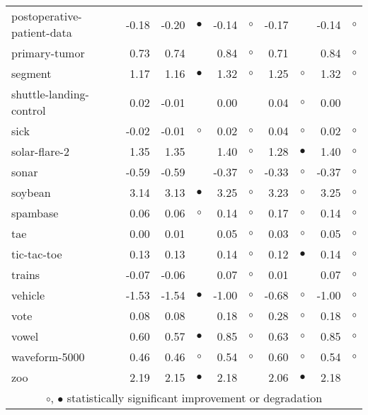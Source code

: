 {\begin{longtable}{lrr@{\hspace{0.1cm}}cr@{\hspace{0.1cm}}cr@{\hspace{0.1cm}}cr@{\hspace{0.1cm}}c}
postoperative-patient-data & -0.18 & -0.20 &  $\bullet$ & -0.14 &   $\circ$ & -0.17 &           & -0.14 &   $\circ$\\
primary-tumor &  0.73 &  0.74 &            &  0.84 &   $\circ$ &  0.71 &           &  0.84 &   $\circ$\\
segment &  1.17 &  1.16 &  $\bullet$ &  1.32 &   $\circ$ &  1.25 &   $\circ$ &  1.32 &   $\circ$\\
shuttle-landing-control &  0.02 & -0.01 &            &  0.00 &           &  0.04 &   $\circ$ &  0.00 &          \\
sick & -0.02 & -0.01 &    $\circ$ &  0.02 &   $\circ$ &  0.04 &   $\circ$ &  0.02 &   $\circ$\\
solar-flare-2 &  1.35 &  1.35 &            &  1.40 &   $\circ$ &  1.28 & $\bullet$ &  1.40 &   $\circ$\\
sonar & -0.59 & -0.59 &            & -0.37 &   $\circ$ & -0.33 &   $\circ$ & -0.37 &   $\circ$\\
soybean &  3.14 &  3.13 &  $\bullet$ &  3.25 &   $\circ$ &  3.23 &   $\circ$ &  3.25 &   $\circ$\\
spambase &  0.06 &  0.06 &    $\circ$ &  0.14 &   $\circ$ &  0.17 &   $\circ$ &  0.14 &   $\circ$\\
tae &  0.00 &  0.01 &            &  0.05 &   $\circ$ &  0.03 &   $\circ$ &  0.05 &   $\circ$\\
tic-tac-toe &  0.13 &  0.13 &            &  0.14 &   $\circ$ &  0.12 & $\bullet$ &  0.14 &   $\circ$\\
trains & -0.07 & -0.06 &            &  0.07 &   $\circ$ &  0.01 &           &  0.07 &   $\circ$\\
vehicle & -1.53 & -1.54 &  $\bullet$ & -1.00 &   $\circ$ & -0.68 &   $\circ$ & -1.00 &   $\circ$\\
vote &  0.08 &  0.08 &            &  0.18 &   $\circ$ &  0.28 &   $\circ$ &  0.18 &   $\circ$\\
vowel &  0.60 &  0.57 &  $\bullet$ &  0.85 &   $\circ$ &  0.63 &   $\circ$ &  0.85 &   $\circ$\\
waveform-5000 &  0.46 &  0.46 &    $\circ$ &  0.54 &   $\circ$ &  0.60 &   $\circ$ &  0.54 &   $\circ$\\
zoo &  2.19 &  2.15 &  $\bullet$ &  2.18 &           &  2.06 & $\bullet$ &  2.18 &          \\
\hline
\multicolumn{10}{c}{$\circ$, $\bullet$ statistically significant improvement or degradation}\\
\end{longtable} \footnotesize \par}